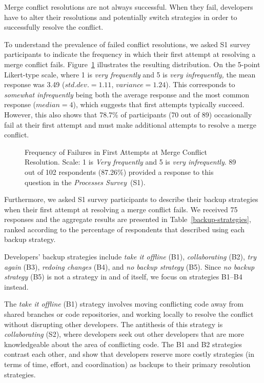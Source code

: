
Merge conflict resolutions are not always successful.
When they fail, developers have to alter their resolutions and potentially switch strategies in order to successfully resolve the conflict.

To understand the prevalence of failed conflict resolutions, we asked S1 survey participants to indicate the frequency in which their first attempt at resolving a merge conflict fails.
Figure~\ref{fig:first-attempt-failure} illustrates the resulting distribution.
On the 5-point Likert-type scale, where 1 is \textit{very frequently} and 5 is \textit{very infrequently,} the mean response was 3.49 ($std. dev.=1.11$, $variance=1.24$).
This corresponds to \textit{somewhat infrequently} being both the average response and the most common response ($median=4$), which suggests that first attempts typically succeed.
However, this also shows that 78.7\% of participants (70 out of 89) occasionally fail at their first attempt and must make additional attempts to resolve a merge conflict.

\begin{figure}
	\centering
	\caption{Frequency of Failures in First Attempts at Merge Conflict Resolution. Scale: 1 is \textit{Very frequently} and 5 is \textit{very infrequently}. 89 out of 102 respondents (87.26\%) provided a response to this question in the \textit{Processes Survey}~(S1).\vspace*{-0.3\baselineskip}}
	\label{fig:first-attempt-failure}
\end{figure}

Furthermore, we asked S1 survey participants to describe their backup strategies when their first attempt at resolving a merge conflict fails.
We received 75 responses and the aggregate results are presented in Table~\ref{backup-strategies}, ranked according to the percentage of respondents that described using each backup strategy.

Developers' backup strategies include \textit{take it offline} (B1), \textit{collaborating} (B2), \textit{try again} (B3), \textit{redoing changes} (B4), and \textit{no backup strategy} (B5).
Since \textit{no backup strategy} (B5) is not a strategy in and of itself, we focus on strategies B1--B4 instead.

The \textit{take it offline} (B1) strategy involves moving conflicting code away from shared branches or code repositories, and working locally to resolve the conflict without disrupting other developers.
The antithesis of this strategy is \textit{collaborating} (S2), where developers seek out other developers that are more knowledgeable about the area of conflicting code.
The B1 and B2 strategies contrast each other, and show that developers reserve more costly strategies (in terms of time, effort, and coordination) as backups to their primary resolution strategies.

